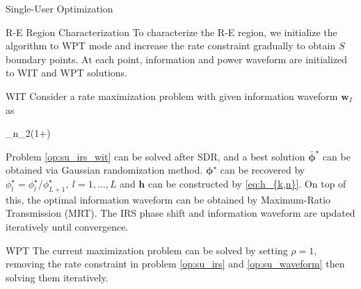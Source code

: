 \documentclass{IEEEtran}
\begin{document}
\begin{section}{Single-User Optimization}
	\begin{subsection}{R-E Region Characterization}
		To characterize the R-E region, we initialize the algorithm to WPT mode and increase the rate constraint gradually to obtain $S$ boundary points. At each point, information and power waveform are initialized to WIT and WPT solutions.
		\begin{subsubsection}{WIT}
			Consider a rate maximization problem with given information waveform $\boldsymbol{w}_I$ as
			\begin{maxi!}
					{\boldsymbol{\Phi}}{\sum_{n}{\log_2\left(1+\right)}}{\label{op:su_irs_wit}}{}
				\end{maxi!}
			Problem \ref{op:su_irs_wit} can be solved after SDR, and a best solution $\bar{\boldsymbol{\phi}}^\star$ can be obtained via Gaussian randomization method. $\boldsymbol{\phi}^\star$ can be recovered by $\phi_l^\star=\phi_l^\star/\phi_{L+1}^\star, \ l=1,\dots,L$ and $\boldsymbol{h}$ can be constructed by \ref{eq:h_{k,n}}. On top of this, the optimal information waveform can be obtained by Maximum-Ratio Transmission (MRT). The IRS phase shift and information waveform are updated iteratively until convergence.
		\end{subsubsection}

		\begin{subsubsection}{WPT}
			The current maximization problem can be solved by setting $\rho = 1$, removing the rate constraint in problem \ref{op:su_irs} and \ref{op:su_waveform} then solving them iteratively.
		\end{subsubsection}


\end{subsection}
\end{section}
\end{document}
